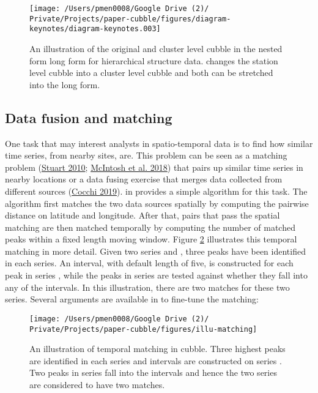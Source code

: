 \documentclass{article}
\begin{document}
\begin{figure}

{\centering \texttt{[image: /Users/pmen0008/Google Drive (2)/ Private/Projects/paper-cubble/figures/diagram-keynotes/diagram-keynotes.003]} 

}

\caption{An illustration of the original and cluster level cubble in the nested form long form for hierarchical structure data.  changes the station level cubble into a cluster level cubble and both can be stretched into the long form.}\label{fig:illu-hier}
\end{figure}

\hypertarget{matching}{%
\subsection{Data fusion and matching}\label{matching}}

One task that may interest analysts in spatio-temporal data is to find how similar time series, from nearby sites, are. This problem can be seen as a matching problem (\protect\hyperlink{ref-stuart2010matching}{Stuart 2010}; \protect\hyperlink{ref-mcintosh2018using}{McIntosh et al. 2018}) that pairs up similar time series in nearby locations or a data fusing exercise that merges data collected from different sources (\protect\hyperlink{ref-cocchi2019data}{Cocchi 2019}).  in  provides a simple algorithm for this task. The algorithm first matches the two data sources spatially by computing the pairwise distance on latitude and longitude. After that, pairs that pass the spatial matching are then matched temporally by computing the number of matched peaks within a fixed length moving window. Figure \ref{fig:illu-matching} illustrates this temporal matching in more detail. Given two series  and , three peaks have been identified in each series. An interval, with default length of five, is constructed for each peak in series , while the peaks in series  are tested against whether they fall into any of the intervals. In this illustration, there are two matches for these two series. Several arguments are available in  to fine-tune the matching:

\begin{figure}
\texttt{[image: /Users/pmen0008/Google Drive (2)/ Private/Projects/paper-cubble/figures/illu-matching]} \caption{An illustration of temporal matching in cubble. Three highest peaks are identified in each series and intervals are constructed on series . Two peaks in series  fall into the intervals and hence the two series are considered to have two matches.}\label{fig:illu-matching}
\end{figure}
\end{document}
